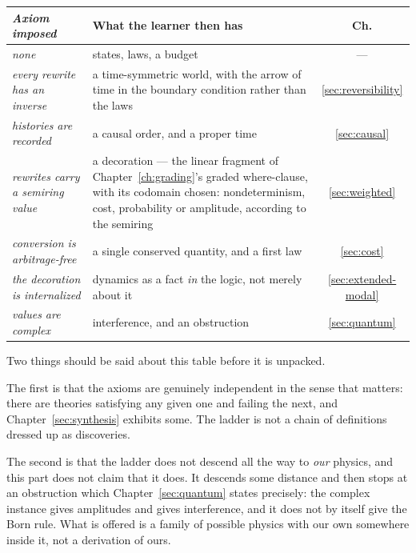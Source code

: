 \begin{center}
\renewcommand{\arraystretch}{1.3}
\begin{tabular}{>{\itshape}p{4.4cm} p{5.4cm} c}
\toprule
\normalfont\textbf{Axiom imposed} & \textbf{What the learner then has} & \textbf{Ch.} \\
\midrule
none
  & states, laws, a budget
  & --- \\
every rewrite has an inverse
  & a time-symmetric world, with the arrow of time in the boundary
    condition rather than the laws
  & \ref{sec:reversibility} \\
histories are recorded
  & a causal order, and a proper time
  & \ref{sec:causal} \\
rewrites carry a semiring value
  & a decoration --- the linear fragment of Chapter~\ref{ch:grading}'s
    graded where-clause, with its codomain chosen: nondeterminism, cost,
    probability or amplitude, according to the semiring
  & \ref{sec:weighted} \\
conversion is arbitrage-free
  & a single conserved quantity, and a first law
  & \ref{sec:cost} \\
the decoration is internalized
  & dynamics as a fact \emph{in} the logic, not merely about it
  & \ref{sec:extended-modal} \\
values are complex
  & interference, and an obstruction
  & \ref{sec:quantum} \\
\bottomrule
\end{tabular}
\end{center}

Two things should be said about this table before it is unpacked.

The first is that the axioms are genuinely independent in the sense that
matters: there are theories satisfying any given one and failing the
next, and Chapter~\ref{sec:synthesis} exhibits some.
The ladder is not a chain of definitions dressed up as discoveries.

The second is that the ladder does not descend all the way to
\emph{our} physics, and this part does not claim that it does.
It descends some distance and then stops at an obstruction which
Chapter~\ref{sec:quantum} states precisely: the complex instance gives
amplitudes and gives interference, and it does not by itself give the
Born rule.
What is offered is a family of possible physics with our own somewhere
inside it, not a derivation of ours.

